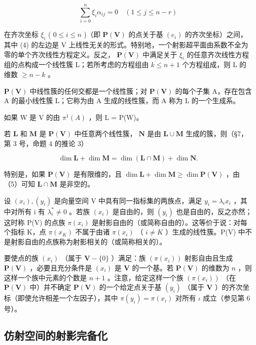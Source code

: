 \[
\sum_ {i = 0} ^ {n} \xi_ {i} \alpha_ {i j} = 0 \quad (1 \leqslant j \leqslant n - r)\tag{4}
\]

在齐次坐标 \(\xi_{i}\) ( \(0 \leqslant i \leqslant n\) )（即 \(\mathbf{P}(\mathbf{V})\) 的点关于基 \((e_{i})\) 的齐次坐标）之间，其中 (4) 的左边是 V 上线性无关的形式。特别地，一个射影超平面由系数不全为零的单个齐次线性方程定义。反之， \(\mathbf{P}(\mathbf{V})\) 中满足关于 \(\xi_{i}\) 的任意齐次线性方程组的点构成一个线性簇 L；若所考虑的方程组由 \(k \leqslant n + 1\) 个方程组成，则 L 的维数 \(\geqslant n - k\) 。

 \(\mathbf{P}(\mathbf{V})\) 中线性簇的任何交都是一个线性簇；对 \(\mathbf{P}(\mathbf{V})\) 的每个子集 A，存在包含 A 的最小线性簇 L；它称为由 A 生成的线性簇，而 A 称为 L 的一个生成系。

如果 W 是 V 的由 \(\pi^{1}(A)\) ，则 L = P(W)。

若 \(\mathbf{L}\) 和 \(\mathbf{M}\) 是 \(\mathbf{P}(\mathbf{V})\) 中任意两个线性簇， \(\mathbf{N}\) 是由 \(\mathbf{L} \cup \mathbf{M}\) 生成的簇，则（§7，第 3 号，命题 4 的推论 3）

\[
\dim \mathbf {L} + \dim \mathbf {M} = \dim (\mathbf {L} \cap \mathbf {M}) + \dim \mathbf {N}.\tag{5}
\]

特别是，如果 \(\mathbf{P}(\mathbf{V})\) 是有限维的，且 \(\dim \mathbf{L} + \dim \mathbf{M} \geqslant \dim \mathbf{P}(\mathbf{V})\) ，由（5）可知 \(\mathbf{L} \cap \mathbf{M}\) 是非空的。

设 \((x_{i}), (y_{i})\) 是向量空间 V 中具有同一指标集的两族点，满足 \(y_{i} = \lambda_{i}x_{i}\) ，其中对所有 i 有 \(\lambda_{i}^{*} \neq 0\) 。若族 \((x_{i})\) 是自由的，则 \((y_{i})\) 也是自由的，反之亦然；这时称 P(V) 的点族 \(\pi(x_{i})\) 是射影自由的（或简称自由的）。这等价于说：对每个指标 K，点 \(\pi(x_{K})\) 不属于由诸 \(\pi(x_{i})\) （ \(i \neq K\) ）生成的线性簇。P(V) 中不是射影自由的点族称为射影相关的（或简称相关的）。

要使点的族 \((x_{i})\) （属于 \(\mathbf{V} - \{0\}\) ）满足：族 \((\pi (x_{i}))\) 射影自由且生成 \(\mathbf{P}(\mathbf{V})\) ，必要且充分条件是 \((x_{i})\) 是 \(\mathbf{V}\) 的一个基。若 \(\mathbf{P}(\mathbf{V})\) 的维数为 \(n\) ，则这样一个族中元素的个数是 \(n + 1\) 。注意，给定这样一个族 \((\pi (x_{i}))\) （在 \(\mathbf{P}(\mathbf{V})\) 中）并不确定 \(\mathbf{P}(\mathbf{V})\) 的一个给定点关于基 \((y_{i})\) （属于 \(\mathbf{V}\) ）的齐次坐标（即使允许相差一个左因子），其中 \(\pi (y_{i}) = \pi (x_{i})\) 对所有 \(\iota\) 成立（参见第 6 号）。

\subsection{仿射空间的射影完备化}

